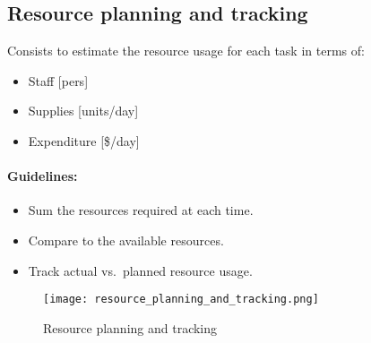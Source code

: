 \subsection{Resource planning and tracking}

Consists to estimate the resource usage for each task in terms of:

\begin{itemize}
    \item Staff [pers]
    \item Supplies [units/day]
    \item Expenditure [\$/day]
\end{itemize}

\paragraph{Guidelines:}
\begin{itemize}
 \item Sum the resources required at each time.
 \item Compare to the available resources.
 \item Track actual vs.\ planned resource usage.
\end{itemize}

\begin{figure}[!ht]
    \centering
    \texttt{[image: resource\_planning\_and\_tracking.png]}
    \caption{Resource planning and tracking}
\end{figure}
\FloatBarrier{}
